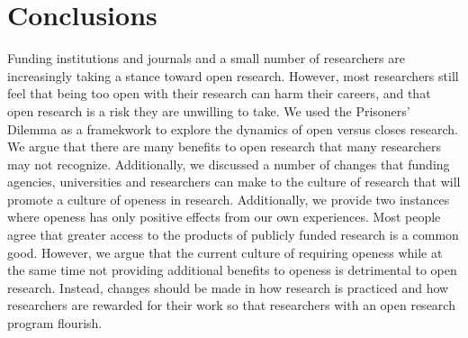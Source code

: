 \documentclass[11pt]{article} %
\begin{document}
\section{Conclusions}
Funding institutions and journals and a small number of researchers are increasingly taking a stance toward open research. However, most researchers still feel that being too open with their research can harm their careers, and that open research is a risk they are unwilling to take. We used the Prisoners' Dilemma as a framekwork to explore the dynamics of open versus closes research. We argue that there are many benefits to open research that many researchers may not recognize. Additionally, we discussed a number of changes that funding agencies, universities and researchers can make to the culture of research that will promote a culture of openess in research. Additionally, we provide two instances where openess has only positive effects from our own experiences. Most people agree that greater access to the products of publicly funded research is a common good. However, we argue that the current culture of requiring openess while at the same time not providing additional benefits to openess is detrimental to open research. Instead, changes should be made in how research is practiced and how researchers are rewarded for their work so that researchers with an open research program flourish.






\end{document}
